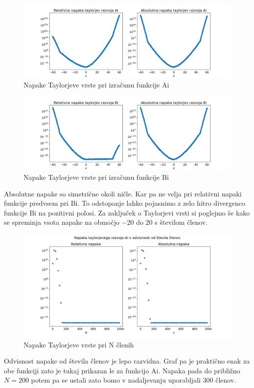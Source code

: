 \documentclass{article}
\newcommand{\Ai}{\mathrm{Ai}}
\newcommand{\Bi}{\mathrm{Bi}}
\begin{document}
\begin{figure}[H]
    \centering
    \includegraphics[width=1.1\textwidth]{Ai_taylorjev_razvoj.png}
    \caption{Napake Taylorjeve vrste pri izračunu funkcije $\Ai$}
\end{figure}
\begin{figure}[H]
    \centering
    \includegraphics[width=1.1\textwidth]{Bi_taylorjev_razvoj.png}
    \caption{Napake Taylorjeve vrste pri izračunu funkcije $\Bi$}
\end{figure}
Absolutne napake so simetrične okoli ničle. Kar pa ne velja pri relativni napaki funkcije predvsem pri $\Bi$. To odstopanje lahko pojasnimo z zelo hitro divergenco funkcije $\Bi$ na pozitivni polosi. Za zaključek o Taylorjevi vrsti si poglejmo še kako se spreminja vsota napake na območjo $-20$ do $20$ s številom členov.
\begin{figure}[H]
    \centering
    \includegraphics[width=1.1\textwidth]{taylor_cleni_Ai.png}
    \caption{Napake Taylorjeve vrste pri N členih}
\end{figure}
Odvisnost napake od števila členov je lepo razvidna. Graf pa je praktično enak za obe funkciji zato je tukaj prikazan le za funkcijo $\Ai$. Napaka pada do približno $N=200$ potem pa se ustali zato bomo v nadaljevanju uporabljali 300 členov.
\end{document}

